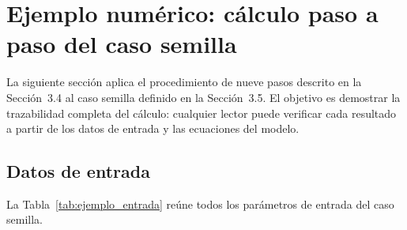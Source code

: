 \section{Ejemplo numérico: cálculo paso a paso del caso semilla}

La siguiente sección aplica el procedimiento de nueve pasos descrito en la Sección~3.4 al
caso semilla definido en la Sección~3.5. El objetivo es demostrar la trazabilidad completa
del cálculo: cualquier lector puede verificar cada resultado a partir de los datos de entrada
y las ecuaciones del modelo.

\subsection{Datos de entrada}

La Tabla~\ref{tab:ejemplo_entrada} reúne todos los parámetros de entrada del caso semilla.

